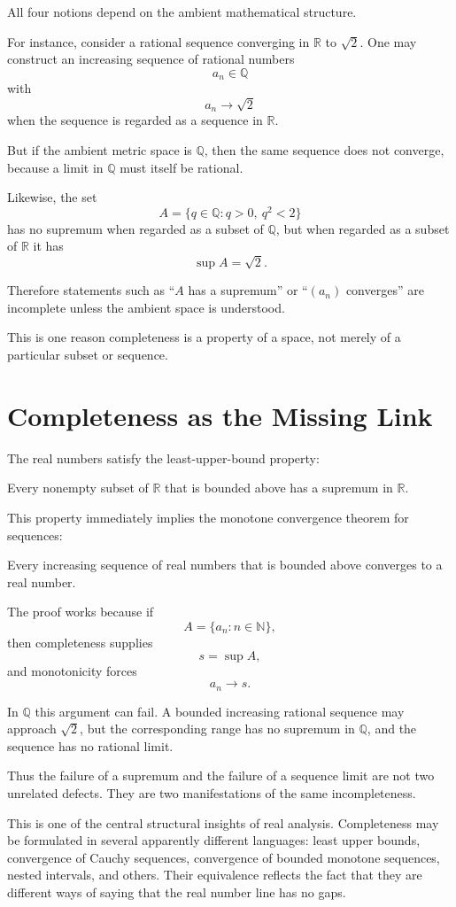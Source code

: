 \documentclass{essay}
\begin{document}
All four notions depend on the ambient mathematical structure.

For instance, consider a rational sequence converging in \(\mathbb{R}\) to \(\sqrt{2}\). One may construct an increasing sequence of rational numbers
\[ a_{n}\in\mathbb{Q} \]
with
\[ a_{n}\to\sqrt{2} \]
when the sequence is regarded as a sequence in \(\mathbb{R}\).

But if the ambient metric space is \(\mathbb{Q}\), then the same sequence does not converge, because a limit in \(\mathbb{Q}\) must itself be rational.

Likewise, the set
\[ A=\{q\in\mathbb{Q}:q>0,\ q^{2}<2\} \]
has no supremum when regarded as a subset of \(\mathbb{Q}\), but when regarded as a subset of \(\mathbb{R}\) it has
\[ \sup A=\sqrt{2}. \]

Therefore statements such as ``\(A\) has a supremum'' or ``\((a_{n})\) converges'' are incomplete unless the ambient space is understood.

This is one reason completeness is a property of a space, not merely of a particular subset or sequence.

\section{Completeness as the Missing Link}

The real numbers satisfy the least-upper-bound property:

\medskip
\noindent
Every nonempty subset of \(\mathbb{R}\) that is bounded above has a supremum in \(\mathbb{R}\).
\medskip

This property immediately implies the monotone convergence theorem for sequences:

\medskip
\noindent
Every increasing sequence of real numbers that is bounded above converges to a real number.
\medskip

The proof works because if
\[ A=\{a_{n}:n\in\mathbb{N}\}, \]
then completeness supplies
\[ s=\sup A, \]
and monotonicity forces
\[ a_{n}\to s. \]

In \(\mathbb{Q}\) this argument can fail. A bounded increasing rational sequence may approach \(\sqrt{2}\), but the corresponding range has no supremum in \(\mathbb{Q}\), and the sequence has no rational limit.

Thus the failure of a supremum and the failure of a sequence limit are not two unrelated defects. They are two manifestations of the same incompleteness.

This is one of the central structural insights of real analysis. Completeness may be formulated in several apparently different languages: least upper bounds, convergence of Cauchy sequences, convergence of bounded monotone sequences, nested intervals, and others. Their equivalence reflects the fact that they are different ways of saying that the real number line has no gaps.
\end{document}
